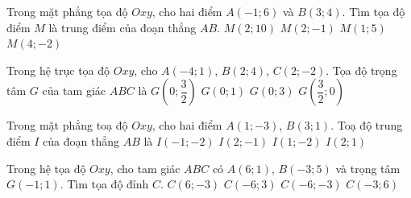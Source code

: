 \begin{ex}%
	Trong mặt phẳng tọa độ $Oxy$, cho hai điểm $A(-1;6)$ và $B(3;4)$. Tìm tọa độ điểm $M$ là trung điểm của  đoạn thẳng $AB$.
	\choice 
		{$M\left(2;10\right)$} 
		 {$M\left(2;-1\right)$}
		{\True $M\left(1;5\right)$} 
		 {$M\left(4;-2\right)$}
\end{ex}

\begin{ex}%
	Trong hệ trục tọa độ $Oxy$, cho $A(-4; 1)$, $B(2; 4)$, $C(2;-2)$. Tọa độ  trọng tâm $G$ của tam giác $ABC$ là
	\choice 
		 {$G\left(0; \dfrac{3}{2}\right)$}
		{\True  $G(0; 1)$}
		 {$G(0; 3)$}
		{$G\left(\dfrac{3}{2}; 0\right)$} 
\end{ex}

\begin{ex}%
	Trong mặt phẳng toạ độ $Oxy$,  cho hai điểm $A(1;-3)$, $B(3; 1)$. Toạ độ trung điểm $I$ của đoạn thẳng $AB$ là
	 \choice
		{$I(-1;-2)$} 
		{\True $I(2;-1)$} 
		 {$I(1;-2)$}
		{$I(2; 1)$} 
\end{ex}

\begin{ex}%
	Trong hệ tọa độ $Oxy$, cho tam giác $ABC$ có $A(6; 1)$, $B(-3; 5)$ và trọng tâm $G(-1; 1)$. Tìm tọa  độ đỉnh $C$.
	 \choice
		 {$C(6;-3)$}
		 {$C(-6; 3)$}
		 {\True $C(-6;-3)$}
		 {$C(-3; 6)$}
\end{ex}

